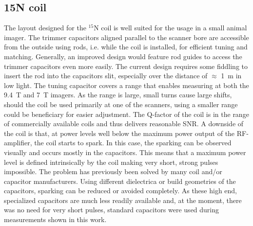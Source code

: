         \subsection{15N coil}
            The layout designed for the $^{15}$N coil is well suited for the usage in a small animal imager. The trimmer capacitors aligned parallel to the scanner bore are accessible from the outside using rods, i.e. while the coil is installed, for efficient tuning and matching. Generally, an improved design would feature rod guides to access the trimmer capacitors even more easily. The current design requires some fiddling to insert the rod into the capacitors slit, especially over the distance of $\approx$ \SI{1}{\meter} in low light.
            The tuning capacitor covers a range that enables measuring at both the \SI{9.4}{\tesla} and \SI{7}{\tesla} imagers. As the range is large, small turns cause large shifts, should the coil be used primarily at one of the scanners, using a smaller range could be beneficiary for easier adjustment.
            The Q-factor of the coil is in the range of commercially available coils and thus delivers reasonable SNR.
            A downside of the coil is that, at power levels well below the maximum power output of the RF-amplifier, the coil starts to spark. In this case, the sparking can be observed visually and occurs mostly in the capacitors. This means that a maximum power level is defined intrinsically by the coil making very short, strong pulses impossible. The problem has previously been solved by many coil and/or capacitor manufacturers. Using different dielectrica or build geometries of the capacitors, sparking can be reduced or avoided completely. As these high end, specialized capacitors are much less readily available and, at the moment, there was no need for very short pulses, standard capacitors were used during measurements shown in this work.
